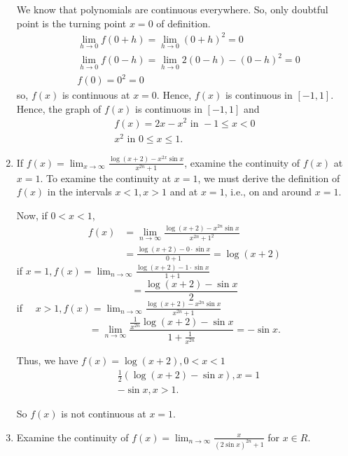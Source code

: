 \begin{enumerate}
We know that polynomials are continuous everywhere. So, only doubtful point is the turning point $x=0$ of definition.
$$
\begin{aligned}
& \lim _{h \rightarrow 0} f(0+h)=\lim _{h \rightarrow 0}(0+h)^2=0 \\
& \lim _{h \rightarrow 0} f(0-h)=\lim _{h \rightarrow 0} 2(0-h)-(0-h)^2=0 \\
& f(0)=0^2=0
\end{aligned}
$$
so, $f(x)$ is continuous at $x=0$.
Hence, $f(x)$ is continuous in $[-1,1]$.
Hence, the graph of $f(x)$ is continuous in $[-1,1]$ and
$$
\begin{gathered}
f(x)=2 x-x^2 \text { in }-1 \leq x<0 \\
x^2 \text { in } 0 \leq x \leq 1 .
\end{gathered}
$$

\item  If $f(x)=\lim _{x \rightarrow \infty} \frac{\log (x+2)-x^{2 x} \sin x}{x^{2 n}+1}$,
examine the continuity of $f(x)$ at $x=1$.
To examine the continuity at $x=1$, we must derive the definition of $f(x)$ in the intervals $x<1, x>1$ and at $x=1$, i.e., on and around $x=1$.

Now, if $0<x<1$,
$$
\begin{aligned}
f(x) & =\lim _{n \rightarrow \infty} \frac{\log (x+2)-x^{2 n} \sin x}{x^{2 n}+1^2} \\
& =\frac{\log (x+2)-0 \cdot \sin x}{0+1}=\log (x+2)
\end{aligned}
$$
if $x=1, f(x)=\lim _{n \rightarrow \infty} \frac{\log (x+2)-1 \cdot \sin x}{1+1}$
$$
=\frac{\log (x+2)-\sin x}{2}
$$
if $\quad x>1, f(x)=\lim _{n \rightarrow \infty} \frac{\log (x+2)-x^{2 n} \sin x}{x^{2 n}+1}$
$$
=\lim _{n \rightarrow \infty} \frac{\frac{1}{x^{2 n}} \log (x+2)-\sin x}{1+\frac{1}{x^{2 n}}}=-\sin x .
$$

Thus, we have $f(x)=\log (x+2), 0<x<1$
$$
\begin{aligned}
& \frac{1}{2}(\log (x+2)-\sin x), x=1 \\
&-\sin x, x>1 .
\end{aligned}
$$

So $f(x)$ is not continuous at $x=1$.

\item Examine the continuity of $f(x)=\lim _{n \rightarrow \infty} \frac{x}{(2 \sin x)^{2 n}+1}$ for $x \in R$.\\\\


\end{enumerate}

